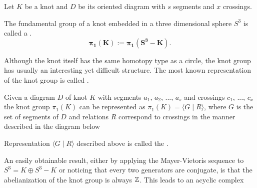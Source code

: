 Let $K$ be a knot and $D$ be its oriented diagram with $s$ segments and $x$ crossings. 
\begin{definition} 
  The fundamental group of a knot embedded in a three dimensional sphere $S^3$ is called a .
  $$\mathbf{\pi_1(K):=\pi_1(S^3-K)}.
  $$
\end{definition}
Although the knot itself has the same homotopy type as a circle, the knot group has usually an interesting yet difficult structure. The most known representation of the knot group is called .

\begin{definition}
  Given a diagram $D$ of knot $K$ with segments $a_1$, $a_2$, ..., $a_s$ and crossings $c_1$, ..., $c_x$ the knot group $\pi_1(K)$ can be represented as $\pi_1(K)=\langle G\;|\;R\rangle$, where $G$ is the set of segments of $D$ and relations $R$ correspond to crossings in the manner described in the diagram below
  \begin{center}
  \end{center}
  Representation $\langle G\;|\;R\rangle$ described above is called the  \cite[Chapter~6]{livingstone}.
\end{definition}

An easily obtainable result, either by applying the Mayer-Vietoris sequence to $S^3=K\oplus S^3-K$ or noticing that every two generators are conjugate, is that the abelianization of the knot group is always $\operatorname{\mathbb{Z}}$. This leads to an acyclic complex
\begin{center}
\end{center}

